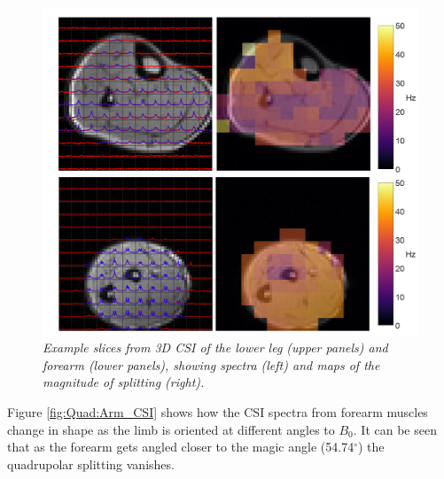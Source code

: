 \begin{figure}
    \centering
    \includegraphics[width=1\textwidth]{Figures/Quad/Calf_Arm_CSI.png}
    \caption{\textit{Example slices from 3D \ac{CSI} of the lower leg (upper panels) and forearm (lower panels), showing spectra (left) and maps of the magnitude of splitting (right).}}
    \label{fig:Quad:Calf_Arm_CSI}
\end{figure}

Figure \ref{fig:Quad:Arm_CSI} shows how the \ac{CSI} spectra from forearm muscles change in shape as the limb is oriented at different angles to $B_0$. It can be seen that as the forearm gets angled closer to the magic angle (54.74$^\circ$) the quadrupolar splitting vanishes. 

